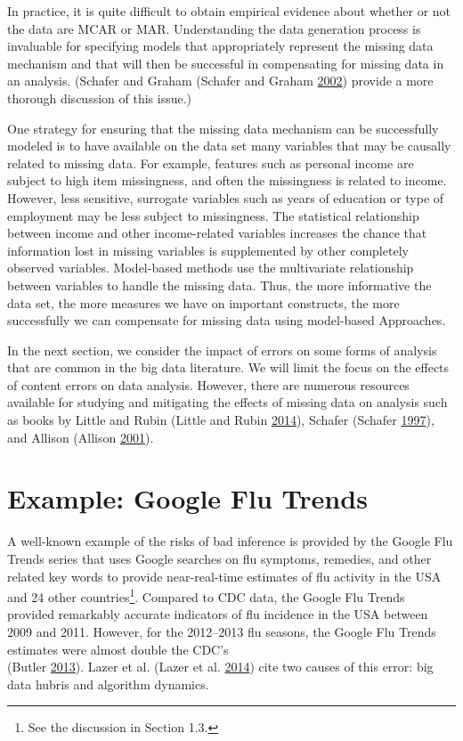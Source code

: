 \documentclass[]{krantz}
\begin{document}
In practice, it is quite difficult to obtain empirical evidence about
whether or not the data are MCAR or MAR. Understanding the data
generation process is invaluable for specifying models that
appropriately represent the missing data mechanism and that will then be
successful in compensating for missing data in an analysis. (Schafer and
Graham (Schafer and Graham
\protect\hyperlink{ref-schafer2002missing}{2002}) provide a more
thorough discussion of this issue.)

One strategy for ensuring that the missing data mechanism can be
successfully modeled is to have available on the data set many variables
that may be causally related to missing data. For example, features such
as personal income are subject to high item missingness, and often the
missingness is related to income. However, less sensitive, surrogate
variables such as years of education or type of employment may be less
subject to missingness. The statistical relationship between income and
other income-related variables increases the chance that information
lost in missing variables is supplemented by other completely observed
variables. Model-based methods use the multivariate relationship between
variables to handle the missing data. Thus, the more informative the
data set, the more measures we have on important constructs, the more
successfully we can compensate for missing data using model-based
Approaches.

In the next section, we consider the impact of errors on some forms of
analysis that are common in the big data literature. We will limit the
focus on the effects of content errors on data analysis. However, there
are numerous resources available for studying and mitigating the effects
of missing data on analysis such as books by Little and Rubin (Little
and Rubin \protect\hyperlink{ref-little2014statistical}{2014}), Schafer
(Schafer \protect\hyperlink{ref-schafer1997analysis}{1997}), and Allison
(Allison \protect\hyperlink{ref-allison2001missing}{2001}).

\section{Example: Google Flu Trends}\label{sec:10-3}

A well-known example of the risks of bad inference is provided by the
Google Flu Trends series that uses Google searches on flu symptoms,
remedies, and other related key words to provide near-real-time
estimates of flu activity in the USA and 24 other countries\footnote{See
  the discussion in Section 1.3.}. Compared to CDC data, the Google Flu
Trends provided remarkably accurate indicators of flu incidence in the
USA between 2009 and 2011. However, for the 2012--2013 flu seasons, the
Google Flu Trends estimates were almost double the CDC's\\
(Butler \protect\hyperlink{ref-butler2013google}{2013}). Lazer et al.
(Lazer et al. \protect\hyperlink{ref-lazer2014parable}{2014}) cite two
causes of this error: big data hubris and algorithm dynamics.
\end{document}
